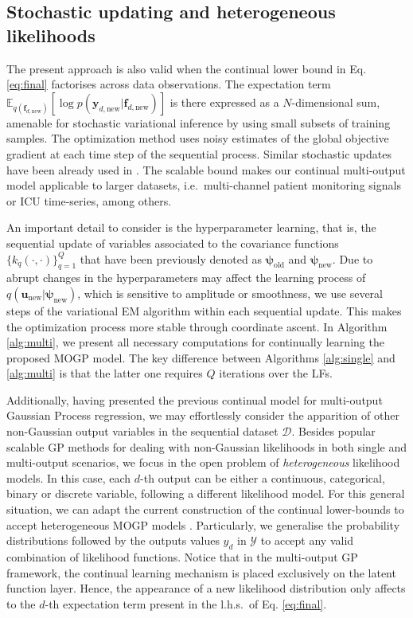 \documentclass[]{article}
\def\u{{\mathbf u}}
\def\f{{\mathbf f}}
\newcommand{\psiold}{{\bm{\psi}_{\text{old}}}}
\newcommand{\psinew}{{\bm{\psi}_{\text{new}}}}
\newcommand{\unew}{{\u_{\text{new}}}}
\newcommand{\Dcal}{\mathcal{D}}
\newcommand{\Ycal}{\mathcal{Y}}
\newcommand{\yc}{\bm{y}}
\begin{document}
\subsection{Stochastic updating and heterogeneous likelihoods}

The present approach is also valid when the continual lower bound in Eq. \eqref{eq:final} factorises across data observations. The expectation term $\mathbb{E}_{q(\f_{d, \text{new}})}\left[\log p(\yc_{d, \text{new}}|\f_{d, \text{new}})\right]$ is there expressed as a $N$-dimensional sum, amenable for stochastic variational inference \citep{hoffman2013stochastic,hensman2013gaussian,morenomunoz2018} by using small subsets of training samples. The optimization method uses noisy estimates of the global objective gradient at each time step of the sequential process. Similar stochastic updates have been already used in \citet{hensman2013gaussian,hensman2015scalable,saul2016chained,morenomunoz2018}. The scalable bound makes our continual multi-output model applicable to larger datasets, i.e.\ multi-channel patient monitoring signals or ICU time-series, among others.

An important detail to consider is the hyperparameter learning, that is, the sequential update of variables associated to the covariance functions $\{k_q(\cdot, \cdot)\}^Q_{q=1}$ that  have been previously denoted as $\psiold$ and $\psinew$. Due to abrupt changes in the hyperparameters may affect the learning process of $q(\unew|\psinew)$, which is sensitive to amplitude or smoothness, we use several steps of the variational EM algorithm \citep{beal2003variational} within each sequential update. This makes the optimization process more stable through coordinate ascent. In Algorithm \ref{alg:multi}, we present all necessary computations for continually learning the proposed MOGP model. The key difference between Algorithms \ref{alg:single} and \ref{alg:multi} is that the latter one requires $Q$ iterations over the LFs.

Additionally, having presented the previous continual model for multi-output Gaussian Process regression,  we may effortlessly consider the apparition of other non-Gaussian output variables in the sequential dataset $\Dcal$. Besides popular scalable GP methods for dealing with non-Gaussian likelihoods \citep{Dezfouli2015blackboxGP,hensman2015scalable} in both single and multi-output scenarios, we focus in the open problem of \textit{heterogeneous} likelihood models. In this case, each $d$-th output can be either a continuous, categorical, binary or discrete variable, following a different likelihood model.  For this general situation, we can adapt the current construction of the continual lower-bounds to accept heterogeneous MOGP models \citep{morenomunoz2018}. Particularly, we generalise the probability distributions followed by the outputs values $y_d$ in $\Ycal$ to accept any valid combination of likelihood functions. Notice that in the multi-output GP framework, the continual learning mechanism is placed exclusively on the latent function layer. Hence, the appearance of a new likelihood distribution only affects to the $d$-th expectation term present in the l.h.s.\ of Eq. \eqref{eq:final}.
\end{document}
